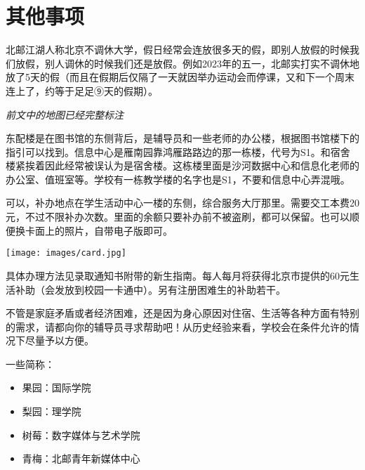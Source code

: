 \section{其他事项}


北邮江湖人称北京不调休大学，假日经常会连放很多天的假，即别人放假的时候我们放假，别人调休的时候我们还是放假。例如2023年的五一，北邮实打实不调休地放了5天的假（而且在假期后仅隔了一天就因举办运动会而停课，又和下一个周末连上了，约等于足足⑨天的假期）。


\emph{前文中的地图已经完整标注}

东配楼是在图书馆的东侧背后，是辅导员和一些老师的办公楼，根据图书馆楼下的指引可以找到。信息中心是雁南园靠鸿雁路路边的那一栋楼，代号为S1。和宿舍楼紧挨着因此经常被误认为是宿舍楼。这栋楼里面是沙河数据中心和信息化老师的办公室、值班室等。学校有一栋教学楼的名字也是S1，不要和信息中心弄混哦。


可以，补办地点在学生活动中心一楼的东侧，综合服务大厅那里。需要交工本费20元，不过不限补办次数。里面的余额只要补办前不被盗刷，都可以保留。也可以顺便换卡面上的照片，自带电子版即可。


\begin{center}
    \texttt{[image: images/card.jpg]}
\end{center}

具体办理方法见录取通知书附带的新生指南。每人每月将获得北京市提供的60元生活补助（会发放到校园一卡通中）。另有注册困难生的补助若干。


不管是家庭矛盾或者经济困难，还是因为身心原因对住宿、生活等各种方面有特别的需求，请都向你的辅导员寻求帮助吧！从历史经验来看，学校会在条件允许的情况下尽量予以方便。


一些简称：
\begin{itemize}
    \item 果园：国际学院
    \item 梨园：理学院
    \item 树莓：数字媒体与艺术学院
    \item 青梅：北邮青年新媒体中心
\end{itemize}

